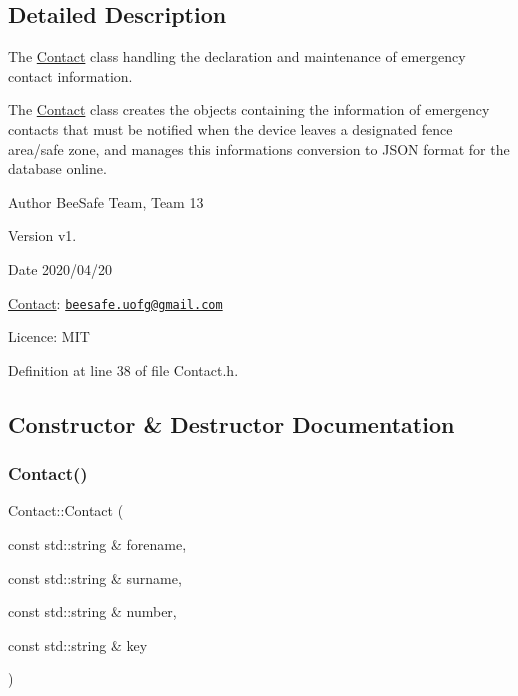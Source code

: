 \subsection{Detailed Description}
The \hyperlink{class_contact}{Contact} class handling the declaration and maintenance of emergency contact information. 

The \hyperlink{class_contact}{Contact} class creates the objects containing the information of emergency contacts that must be notified when the device leaves a designated fence area/safe zone, and manages this information\textquotesingle{}s conversion to J\+S\+ON format for the database online.

\begin{DoxyAuthor}{Author}
Bee\+Safe Team, Team 13
\end{DoxyAuthor}
\begin{DoxyVersion}{Version}
v1.
\end{DoxyVersion}
\begin{DoxyDate}{Date}
2020/04/20
\end{DoxyDate}
\hyperlink{class_contact}{Contact}\+: \href{mailto:beesafe.uofg@gmail.com}{\tt beesafe.\+uofg@gmail.\+com}

Licence\+: M\+IT 

Definition at line 38 of file Contact.\+h.



\subsection{Constructor \& Destructor Documentation}
\mbox{\label{class_contact_a7851a082367f1d01b04b3f8467b9751c}} 
\subsubsection{\texorpdfstring{Contact()}{Contact()}\hspace{0.1cm}{\footnotesize\ttfamily [1/2]}}
{\footnotesize\ttfamily Contact\+::\+Contact (\begin{DoxyParamCaption}\item[{const std\+::string \&}]{forename,  }\item[{const std\+::string \&}]{surname,  }\item[{const std\+::string \&}]{number,  }\item[{const std\+::string \&}]{key }\end{DoxyParamCaption})}

